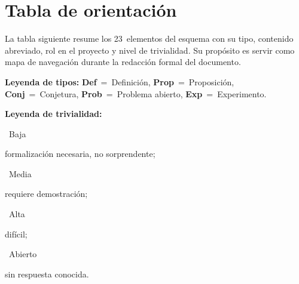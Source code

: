 \documentclass[12pt]{article}
\begin{document}
\section{Tabla de orientación}

La tabla siguiente resume los 23~elementos del esquema con su tipo, contenido
abreviado, rol en el proyecto y nivel de trivialidad. Su propósito es servir
como mapa de navegación durante la redacción formal del documento.

\medskip

\noindent\textbf{Leyenda de tipos:}
\textbf{Def}~=~Definición,\;
\textbf{Prop}~=~Proposición,\;
\textbf{Conj}~=~Conjetura,\;
\textbf{Prob}~=~Problema abierto,\;
\textbf{Exp}~=~Experimento.

\medskip

\noindent\textbf{Leyenda de trivialidad:}
\colorbox{trivBaja}{\strut~Baja~} formalización necesaria, no sorprendente;\;
\colorbox{trivMedia}{\strut~Media~} requiere demostración;\;
\colorbox{trivAlta}{\strut~Alta~} difícil;\;
\colorbox{trivAbierto}{\strut~Abierto~} sin respuesta conocida.

\bigskip

\begingroup
\small
\setlength{\tabcolsep}{4pt}
\renewcommand{\arraystretch}{1.25}
\end{document}
